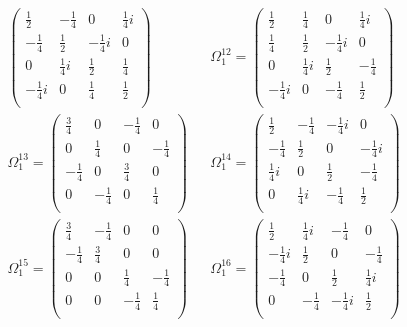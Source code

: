 \begin{align*}
\begin{pmatrix}
    \frac{1}{2}  &  -\frac{1}{4}  &  0  &  \frac{1}{4}i  \\
    -\frac{1}{4}  &  \frac{1}{2}  &  -\frac{1}{4}i  &  0  \\
    0  &  \frac{1}{4}i  &  \frac{1}{2}  &  \frac{1}{4}  \\
    -\frac{1}{4}i  &  0  &  \frac{1}{4}  &  \frac{1}{2}  \\
    \end{pmatrix}
    &&
    \Omega_{1}^{12} = 
    \begin{pmatrix}
    \frac{1}{2}  &  \frac{1}{4}  &  0  &  \frac{1}{4}i  \\
    \frac{1}{4}  &  \frac{1}{2}  &  -\frac{1}{4}i  &  0  \\
    0  &  \frac{1}{4}i  &  \frac{1}{2}  &  -\frac{1}{4}  \\
    -\frac{1}{4}i  &  0  &  -\frac{1}{4}  &  \frac{1}{2}  \\
    \end{pmatrix}
    \\
    \Omega_{1}^{13} = 
    \begin{pmatrix}
    \frac{3}{4}  &  0  &  -\frac{1}{4}  &  0  \\
    0  &  \frac{1}{4}  &  0  &  -\frac{1}{4}  \\
    -\frac{1}{4}  &  0  &  \frac{3}{4}  &  0  \\
    0  &  -\frac{1}{4}  &  0  &  \frac{1}{4}  \\
    \end{pmatrix}
    &&
    \Omega_{1}^{14} = 
    \begin{pmatrix}
    \frac{1}{2}  &  -\frac{1}{4}  &  -\frac{1}{4}i  &  0  \\
    -\frac{1}{4}  &  \frac{1}{2}  &  0  &  -\frac{1}{4}i  \\
    \frac{1}{4}i  &  0  &  \frac{1}{2}  &  -\frac{1}{4}  \\
    0  &  \frac{1}{4}i  &  -\frac{1}{4}  &  \frac{1}{2}  \\
    \end{pmatrix}
    \\
    \Omega_{1}^{15} = 
    \begin{pmatrix}
    \frac{3}{4}  &  -\frac{1}{4}  &  0  &  0  \\
    -\frac{1}{4}  &  \frac{3}{4}  &  0  &  0  \\
    0  &  0  &  \frac{1}{4}  &  -\frac{1}{4}  \\
    0  &  0  &  -\frac{1}{4}  &  \frac{1}{4}  \\
    \end{pmatrix}
    &&
    \Omega_{1}^{16} = 
    \begin{pmatrix}
    \frac{1}{2}  &  \frac{1}{4}i  &  -\frac{1}{4}  &  0  \\
    -\frac{1}{4}i  &  \frac{1}{2}  &  0  &  -\frac{1}{4}  \\
    -\frac{1}{4}  &  0  &  \frac{1}{2}  &  \frac{1}{4}i  \\
    0  &  -\frac{1}{4}  &  -\frac{1}{4}i  &  \frac{1}{2}  \\
    \end{pmatrix}
\end{align*}

